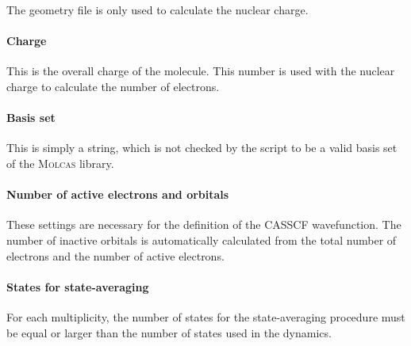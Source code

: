 \documentclass[a4paper,11pt,DIV=15,openany,twoside=false]{scrbook}
\begin{document}
The geometry file is only used to calculate the nuclear charge.

\paragraph{Charge}

This is the overall charge of the molecule. This number is used with the nuclear charge to calculate the number of electrons.

\paragraph{Basis set}

This is simply a string, which is not checked by the script to be a valid basis set of the \textsc{Molcas} library.

\paragraph{Number of active electrons and orbitals}

These settings are necessary for the definition of the CASSCF wavefunction. The number of inactive orbitals is automatically calculated from the total number of electrons and the number of active electrons.

\paragraph{States for state-averaging}

For each multiplicity, the number of states for the state-averaging procedure must be equal or larger than the number of states used in the dynamics.
\end{document}
